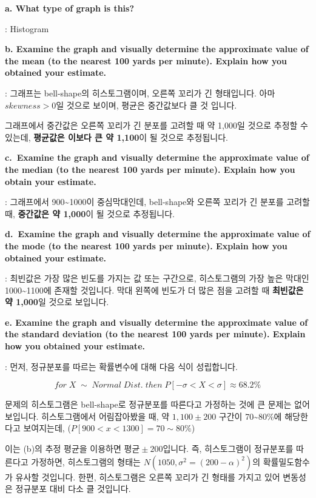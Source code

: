 \documentclass[
  letterpaper,
  DIV=11,
  numbers=noendperiod]{scrreprt}
\begin{document}
\textbf{a. What type of graph is this?}

: Histogram

\textbf{b. Examine the graph and visually determine the approximate
value of the mean (to the nearest 100 yards per minute). Explain how you
obtained your estimate.}

: 그래프는 bell-shape의 히스토그램이며, 오른쪽 꼬리가 긴 형태입니다.
아마 \(skewness>0\)일 것으로 보이며, 평균은 중간값보다 클 것 입니다.

그래프에서 중간값은 오른쪽 꼬리가 긴 분포를 고려할 때 약 1,000일 것으로
추정할 수 있는데, \textbf{평균값은 이보다 큰 약 1,100}이 될 것으로
추정됩니다.

\textbf{c.~Examine the graph and visually determine the approximate
value of the median (to the nearest 100 yards per minute). Explain how
you obtain your estimate.}

: 그래프에서 900\textasciitilde1000이 중심막대인데, bell-shape와 오른쪽
꼬리가 긴 분포를 고려할 때, \textbf{중간값은 약 1,000}이 될 것으로
추정됩니다.

\textbf{d.~Examine the graph and visually determine the approximate
value of the mode (to the nearest 100 yards per minute). Explain how you
obtained your estimate.}

: 최빈값은 가장 많은 빈도를 가지는 값 또는 구간으로, 히스토그램의 가장
높은 막대인 1000\textasciitilde1100에 존재할 것입니다. 막대 왼쪽에
빈도가 더 많은 점을 고려할 때 \textbf{최빈값은 약 1,000}일 것으로
보입니다.

\textbf{e. Examine the graph and visually determine the approximate
value of the standard deviation (to the nearest 100 yards per minute).
Explain how you obtained your estimate.}

: 먼저, 정규분포를 따르는 확률변수에 대해 다음 식이 성립합니다.

\[for\;X\;\sim\;Normal\;Dist.\;then\;P[-\sigma<X<\sigma]\approx 68.2\%\]

문제의 히스토그램은 bell-shape로 정규분포를 따른다고 가정하는 것에 큰
문제는 없어보입니다. 히스토그램에서 어림잡아봤을 때, 약 \(1,100\pm 200\)
구간이 70\textasciitilde80\%에 해당한다고 보여지는데,
(\(P[900<x<1300]=70\sim80\%\))

이는 (b)의 추정 평균을 이용하면 \(평균\pm 200\)입니다. 즉, 히스토그램이
정규분포를 따른다고 가정하면, 히스토그램의 형태는
\(N(1050,\sigma^2=(200-\alpha)^2)\)의 확률밀도함수가 유사할 것입니다.
한편, 히스토그램은 오른쪽 꼬리가 긴 형태를 가지고 있어 변동성은 정규분포
대비 다소 클 것입니다.
\end{document}
